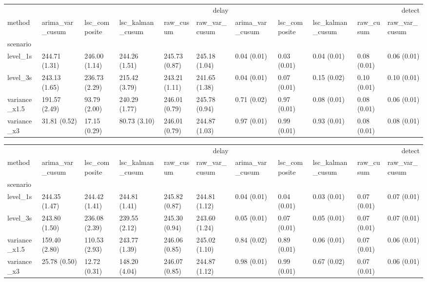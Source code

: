 \begin{tabular}{lllllllllll}
\toprule
 & \multicolumn{5}{r}{delay} & \multicolumn{5}{r}{detect} \\
method & arima_var_cusum & lsc_composite & lsc_kalman_cusum & raw_cusum & raw_var_cusum & arima_var_cusum & lsc_composite & lsc_kalman_cusum & raw_cusum & raw_var_cusum \\
scenario &  &  &  &  &  &  &  &  &  &  \\
\midrule
level_1s & 244.71 (1.31) & 246.00 (1.14) & 244.26 (1.51) & 245.73 (0.87) & 245.18 (1.04) & 0.04 (0.01) & 0.03 (0.01) & 0.04 (0.01) & 0.08 (0.01) & 0.06 (0.01) \\
level_3s & 243.13 (1.65) & 236.73 (2.29) & 215.42 (3.79) & 243.21 (1.11) & 241.65 (1.38) & 0.04 (0.01) & 0.07 (0.01) & 0.15 (0.02) & 0.10 (0.01) & 0.10 (0.01) \\
variance_x1.5 & 191.57 (2.49) & 93.79 (2.00) & 240.29 (1.77) & 246.01 (0.79) & 245.78 (0.94) & 0.71 (0.02) & 0.97 (0.01) & 0.08 (0.01) & 0.08 (0.01) & 0.06 (0.01) \\
variance_x3 & 31.81 (0.52) & 17.15 (0.29) & 80.73 (3.10) & 246.01 (0.79) & 244.87 (1.03) & 0.97 (0.01) & 0.99 (0.01) & 0.93 (0.01) & 0.08 (0.01) & 0.08 (0.01) \\
\bottomrule
\end{tabular}

\begin{tabular}{lllllllllll}
\toprule
 & \multicolumn{5}{r}{delay} & \multicolumn{5}{r}{detect} \\
method & arima_var_cusum & lsc_composite & lsc_kalman_cusum & raw_cusum & raw_var_cusum & arima_var_cusum & lsc_composite & lsc_kalman_cusum & raw_cusum & raw_var_cusum \\
scenario &  &  &  &  &  &  &  &  &  &  \\
\midrule
level_1s & 244.35 (1.47) & 244.42 (1.41) & 244.81 (1.41) & 245.82 (0.87) & 244.81 (1.12) & 0.04 (0.01) & 0.04 (0.01) & 0.03 (0.01) & 0.07 (0.01) & 0.07 (0.01) \\
level_3s & 243.80 (1.50) & 236.08 (2.39) & 239.55 (2.12) & 245.30 (0.94) & 243.60 (1.24) & 0.05 (0.01) & 0.07 (0.01) & 0.05 (0.01) & 0.07 (0.01) & 0.07 (0.01) \\
variance_x1.5 & 159.40 (2.80) & 110.53 (2.93) & 243.77 (1.39) & 246.06 (0.85) & 245.02 (1.10) & 0.84 (0.02) & 0.89 (0.01) & 0.06 (0.01) & 0.07 (0.01) & 0.06 (0.01) \\
variance_x3 & 25.78 (0.50) & 12.72 (0.31) & 148.20 (4.04) & 246.07 (0.85) & 244.87 (1.12) & 0.98 (0.01) & 0.99 (0.01) & 0.67 (0.02) & 0.07 (0.01) & 0.06 (0.01) \\
\bottomrule
\end{tabular}

